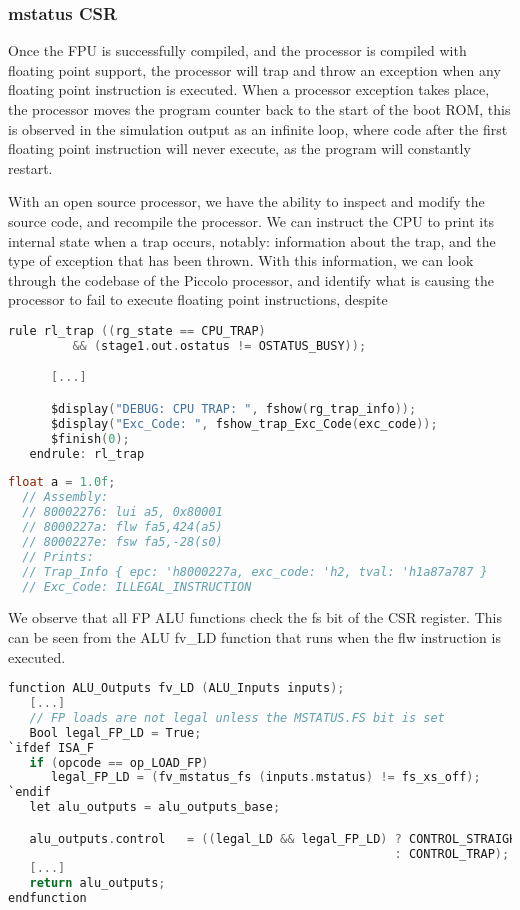 \documentclass[a4paper,9pt]{report}
\begin{document}
\subsubsection{mstatus CSR}
Once the FPU is successfully compiled, and the processor is compiled with
floating point support, the processor will trap and throw an exception when any
floating point instruction is executed. When a processor exception takes place,
the processor moves the program counter back to the start of the boot ROM, this
is observed in the simulation output as an infinite loop, where code after the
first floating point instruction will never execute, as the program will
constantly restart.

With an open source processor, we have the ability to inspect and modify the
source code, and recompile the processor. We can instruct the CPU to print its
internal state when a trap occurs, notably: information about the trap, and the
type of exception that has been thrown. With this information, we can look
through the codebase of the Piccolo processor, and identify what is causing the
processor to fail to execute floating point instructions, despite 


\begin{lstlisting}[language=C,style=customc]
   rule rl_trap ((rg_state == CPU_TRAP)
		 && (stage1.out.ostatus != OSTATUS_BUSY));

      [...]

      $display("DEBUG: CPU TRAP: ", fshow(rg_trap_info));
      $display("Exc_Code: ", fshow_trap_Exc_Code(exc_code));
      $finish(0);
   endrule: rl_trap
\end{lstlisting}
\begin{lstlisting}[language=C,style=customc]
  float a = 1.0f;
  // Assembly:
  // 80002276: lui a5, 0x80001
  // 8000227a: flw fa5,424(a5)
  // 8000227e: fsw fa5,-28(s0)
  // Prints:
  // Trap_Info { epc: 'h8000227a, exc_code: 'h2, tval: 'h1a87a787 }
  // Exc_Code: ILLEGAL_INSTRUCTION
\end{lstlisting}

We observe that all FP ALU functions check the fs bit of the CSR register.
This can be seen from the ALU fv\_LD function that runs when the flw instruction
is executed.
\begin{lstlisting}[language=C,style=customc]
function ALU_Outputs fv_LD (ALU_Inputs inputs);
   [...]
   // FP loads are not legal unless the MSTATUS.FS bit is set
   Bool legal_FP_LD = True;
`ifdef ISA_F
   if (opcode == op_LOAD_FP)
      legal_FP_LD = (fv_mstatus_fs (inputs.mstatus) != fs_xs_off);
`endif
   let alu_outputs = alu_outputs_base;

   alu_outputs.control   = ((legal_LD && legal_FP_LD) ? CONTROL_STRAIGHT
                                                      : CONTROL_TRAP);
   [...]
   return alu_outputs;
endfunction
\end{lstlisting}
\end{document}
